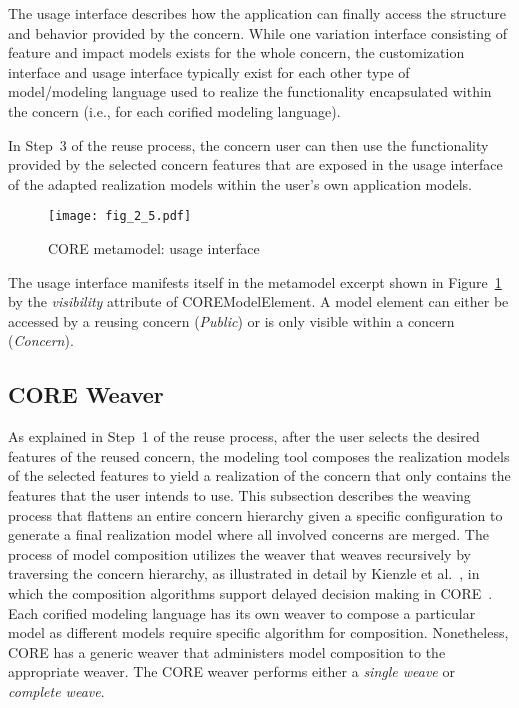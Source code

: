 The usage interface describes how the application can finally access the structure and behavior provided by the concern. While one variation interface consisting of feature and impact models exists for the whole concern, the customization interface and usage interface typically exist for each other type of model/modeling language used to realize the functionality encapsulated within the concern (i.e., for each corified modeling language).

In Step~3 of the reuse process, the concern user can then use the functionality provided by the selected concern features that are exposed in the usage interface of the adapted realization models within the user's own application models.

\begin{figure}
	\centering
	\texttt{[image: fig\_2\_5.pdf]}
	\caption{CORE metamodel: usage interface}
	\label{fig:2.5}
\end{figure}

The usage interface manifests itself in the metamodel excerpt shown in Figure~\ref{fig:2.5} by the \emph{visibility} attribute of {\cls COREModelElement}. A model element can either be accessed by a reusing concern (\emph{Public}) or is only visible within a concern (\emph{Concern}).

\subsection{CORE Weaver}

As explained in Step~1 of the reuse process, after the user selects the desired features of the reused concern, the modeling tool composes the realization models of the selected features to yield a realization of the concern that only contains the features that the user intends to use. This subsection describes the weaving process that flattens an entire concern hierarchy given a specific configuration to generate a final realization model where all involved concerns are merged. The process of model composition utilizes the weaver that weaves recursively by traversing the concern hierarchy, as illustrated in detail by Kienzle et al.~\cite{kienzle2009aspect}, in which the composition algorithms support delayed decision making in CORE~\cite{kienzle2016delaying}. Each corified modeling language has its own weaver to compose a particular model as different models require specific algorithm for composition. Nonetheless, CORE has a generic weaver that administers model composition to the appropriate weaver. The CORE weaver performs either a \emph{single weave} or \emph{complete weave}.

